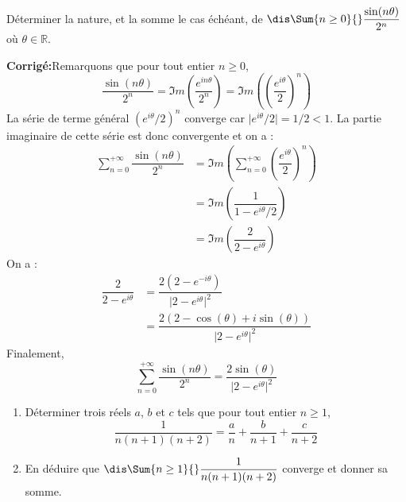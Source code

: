 \documentclass[a4paper,twoside,french,10pt]{VcCours}
\newcommand{\corr}{\textbf{Corrigé:}}
\begin{document}
\medskip

\begin{Exercice}{} Déterminer la nature, et la somme le cas échéant, de $\dis \Sum{n \geq 0}{} \dfrac{\sin(n \theta)}{2^n}$ où $\theta \in \mathbb{R}$.
\end{Exercice}

\corr Remarquons que pour tout entier $n \geq 0$,
$$ \dfrac{\sin(n \theta)}{2^n} = \Im m \left( \dfrac{e^{i n\theta}}{2^n} \right) = \Im m \left(\left( \dfrac{e^{i \theta}}{2} \right)^n \right)$$
La série de terme général $(e^{i \theta}/2)^n$ converge car $\vert e^{i \theta}/2 \vert = 1/2 <1$. La partie imaginaire de cette série est donc convergente et on a :
\begin{align*}
\sum_{n=0}^{+ \infty}  \dfrac{\sin(n \theta)}{2^n}  & = \Im m \left( \sum_{n=0}^{+ \infty} \left( \dfrac{e^{i \theta}}{2} \right)^n \right) \\
& = \Im m \left( \dfrac{1}{1-e^{i \theta}/2} \right) \\
& = \Im m \left( \dfrac{2}{2- e^{i \theta}} \right)
\end{align*}
On a :
\begin{align*}
\dfrac{2}{2- e^{i \theta}} & = \dfrac{2(2-e^{- i\theta})}{\vert 2- e^{i \theta} \vert^2} \\
& = \dfrac{2(2- \cos(\theta)+i \sin(\theta))}{\vert 2- e^{i \theta} \vert^2}
\end{align*}
Finalement,
$$ \sum_{n=0}^{+ \infty}  \dfrac{\sin(n \theta)}{2^n} = \dfrac{2\sin(\theta)}{\vert 2- e^{i \theta} \vert^2}$$

\medskip


\begin{Exercice}{} 
\begin{enumerate}
\item Déterminer trois réels $a$, $b$ et $c$ tels que pour tout entier $n \geq 1$,
$$ \frac{1}{n(n+1)(n+2)} = \frac{a}{n} + \frac{b}{n+1} + \frac{c}{n+2}$$
\item En déduire que $\dis \Sum{n \geq 1}{} \dfrac{1}{n(n+1)(n+2)}$ converge et donner sa somme.
\end{enumerate}
\end{Exercice}
\end{document}
